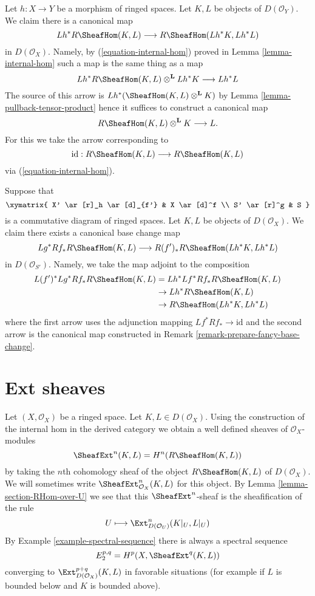 \begin{remark}
\label{remark-prepare-fancy-base-change}
Let $h : X \to Y$ be a morphism of ringed spaces.
Let $K, L$ be objects of $D(\mathcal{O}_Y)$. We claim there is a
canonical map
$$
Lh^*R\SheafHom(K, L) \longrightarrow R\SheafHom(Lh^*K, Lh^*L)
$$
in $D(\mathcal{O}_X)$. Namely, by (\ref{equation-internal-hom})
proved in Lemma \ref{lemma-internal-hom}
such a map is the same thing as a map
$$
Lh^*R\SheafHom(K, L) \otimes^\mathbf{L} Lh^*K \longrightarrow Lh^*L
$$
The source of this arrow is $Lh^*(\SheafHom(K, L) \otimes^\mathbf{L} K)$
by Lemma \ref{lemma-pullback-tensor-product}
hence it suffices to construct a canonical map
$$
R\SheafHom(K, L) \otimes^\mathbf{L} K \longrightarrow L.
$$
For this we take the arrow corresponding to
$$
\text{id} :
R\SheafHom(K, L)
\longrightarrow
R\SheafHom(K, L)
$$
via (\ref{equation-internal-hom}).
\end{remark}

\begin{remark}
\label{remark-fancy-base-change}
Suppose that
$$
\xymatrix{
X' \ar[r]_h \ar[d]_{f'} &
X \ar[d]^f \\
S' \ar[r]^g &
S
}
$$
is a commutative diagram of ringed spaces. Let $K, L$ be objects
of $D(\mathcal{O}_X)$. We claim there exists a canonical base change
map
$$
Lg^*Rf_*R\SheafHom(K, L)
\longrightarrow
R(f')_*R\SheafHom(Lh^*K, Lh^*L)
$$
in $D(\mathcal{O}_{S'})$. Namely, we take the map adjoint to
the composition
\begin{align*}
L(f')^*Lg^*Rf_*R\SheafHom(K, L)
& =
Lh^*Lf^*Rf_*R\SheafHom(K, L) \\
& \to
Lh^*R\SheafHom(K, L) \\
& \to
R\SheafHom(Lh^*K, Lh^*L)
\end{align*}
where the first arrow uses the adjunction mapping
$Lf^*Rf_* \to \text{id}$ and the second arrow is the canonical map
constructed in Remark \ref{remark-prepare-fancy-base-change}.
\end{remark}





\section{Ext sheaves}
\label{section-ext}

\noindent
Let $(X, \mathcal{O}_X)$ be a ringed space. Let $K, L \in D(\mathcal{O}_X)$.
Using the construction of the internal hom in the derived category we
obtain a well defined sheaves of $\mathcal{O}_X$-modules
$$
\SheafExt^n(K, L) = H^n(R\SheafHom(K, L))
$$
by taking the $n$th cohomology sheaf of the object $R\SheafHom(K, L)$
of $D(\mathcal{O}_X)$. We will sometimes write
$\SheafExt^n_{\mathcal{O}_X}(K, L)$ for this object.
By Lemma \ref{lemma-section-RHom-over-U}
we see that this $\SheafExt^n$-sheaf
is the sheafification of the rule
$$
U \longmapsto \Ext^n_{D(\mathcal{O}_U)}(K|_U, L|_U)
$$
By Example \ref{example-spectral-sequence} there is always a spectral
sequence
$$
E_2^{p, q} = H^p(X, \SheafExt^q(K, L))
$$
converging to $\Ext^{p + q}_{D(\mathcal{O}_X)}(K, L)$
in favorable situations (for example if $L$ is bounded below and
$K$ is bounded above).





